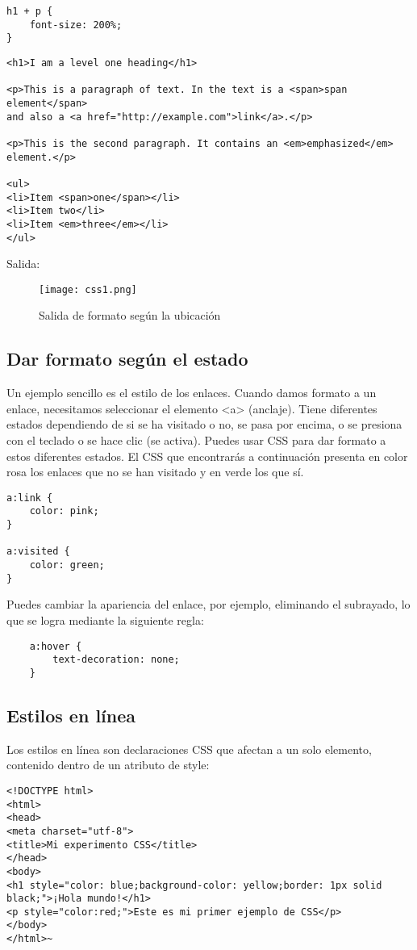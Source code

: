 \begin{lstlisting}
h1 + p {
	font-size: 200%;
}
\end{lstlisting}

\begin{lstlisting}
<h1>I am a level one heading</h1>

<p>This is a paragraph of text. In the text is a <span>span element</span> 
and also a <a href="http://example.com">link</a>.</p>

<p>This is the second paragraph. It contains an <em>emphasized</em> element.</p>

<ul>
<li>Item <span>one</span></li>
<li>Item two</li>
<li>Item <em>three</em></li>
</ul>
\end{lstlisting}

Salida:

\begin{figure}[H]
	\center
	\texttt{[image: css1.png]}
	\caption{Salida de formato según la ubicación}
	\label{fig:super}
\end{figure}

\subsection{Dar formato según el estado}

 Un ejemplo sencillo es el estilo de los enlaces. Cuando damos formato a un enlace, necesitamos seleccionar el elemento <a> (anclaje). Tiene diferentes estados dependiendo de si se ha visitado o no, se pasa por encima, o se presiona con el teclado o se hace clic (se activa). Puedes usar CSS para dar formato a estos diferentes estados. El CSS que encontrarás a continuación presenta en color rosa los enlaces que no se han visitado y en verde los que sí.
 
 \begin{lstlisting}
a:link {
	color: pink;
}

a:visited {
	color: green;
}
 \end{lstlisting}

Puedes cambiar la apariencia del enlace, por ejemplo, eliminando el subrayado, lo que se logra mediante la siguiente regla:

 \begin{lstlisting}
	a:hover {
		text-decoration: none;
	}
\end{lstlisting}

\subsection{Estilos en línea}
Los estilos en línea son declaraciones CSS que afectan a un solo elemento, contenido dentro de un atributo de style:
\begin{lstlisting}
<!DOCTYPE html>
<html>
<head>
<meta charset="utf-8">
<title>Mi experimento CSS</title>
</head>
<body>
<h1 style="color: blue;background-color: yellow;border: 1px solid black;">¡Hola mundo!</h1>
<p style="color:red;">Este es mi primer ejemplo de CSS</p>
</body>
</html>~
\end{lstlisting}

